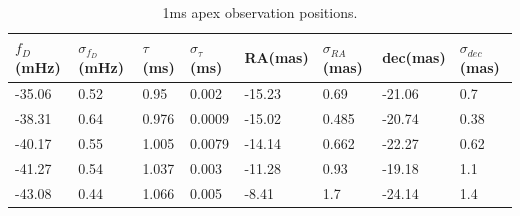 \documentclass[useAMS,usenatbib]{mn2e}
\begin{document}
\begin{table}
\centering
\label{apex1ms}
\begin{tabular}{|l|l|l|l|l|l|l|l|}
\hline
$f_D$(mHz) & $\sigma_{f_D}$(mHz) & $\tau$(ms) & $\sigma_{\tau}$(ms) & RA(mas) & $\sigma_{RA}$(mas) & dec(mas) & $\sigma_{dec}$(mas) \\
\hline
-35.06                           & 0.52                               & 0.95               & 0.002                              & -15.23  & 0.69                                     & -21.06   & 0.7                                      \\
\hline
-38.31                           & 0.64                               & 0.976              & 0.0009                             & -15.02  & 0.485                                    & -20.74   & 0.38                                      \\
\hline
-40.17                           & 0.55                               & 1.005              & 0.0079                             & -14.14  & 0.662                                    & -22.27   & 0.62                                     \\
\hline
-41.27                           & 0.54                               & 1.037              & 0.003                              & -11.28  & 0.93                                     & -19.18   & 1.1                                      \\
\hline
-43.08                           & 0.44                               & 1.066              & 0.005                              & -8.41   & 1.7                                      & -24.14   & 1.4                                        
\end{tabular}
\caption{1ms apex observation positions.}
\label{table:apex}
\end{table}
\end{document}
